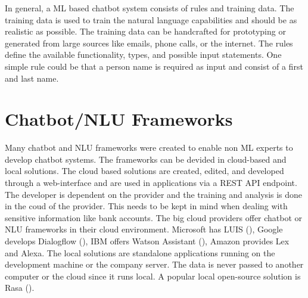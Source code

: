 In general, a ML based chatbot system consists of rules and training data.
The training data is used to train the natural language capabilities and 
should be as realistic as possible.
The training data can be handcrafted for prototyping or generated from large sources like emails, phone calls,
or the internet.
The rules define the available functionality, types, and possible input statements.
One simple rule could be that a person name is required as input and consist of a first and last name.


\section{Chatbot/NLU Frameworks}
Many chatbot and NLU frameworks were created to enable non ML experts to 
develop chatbot systems.
The frameworks can be devided in cloud-based and local solutions.
The cloud based solutions are created, edited, and developed through a web-interface 
and are used in applications via a REST API endpoint.
The developer is dependent on the provider and the training and analysis is done 
in the coud of the provider. This needs to be kept in mind when dealing with
 sensitive information like bank accounts.
The big cloud providers offer chatbot or NLU frameworks in their cloud environment.
Microsoft has LUIS (\citet{luis2015williams, luisdocs}),
Google develops Dialogflow (\citet{dialogflow}),
IBM offers Watson Assistant (\citet{watsonassistant}),
Amazon provides Lex and Alexa.
The local solutions are standalone applications running on the development machine or 
the company server.
The data is never passed to another computer or the cloud since it runs local.
A popular local open-source solution is Rasa (\citet{rasabocklisch2017,rasa}). 


